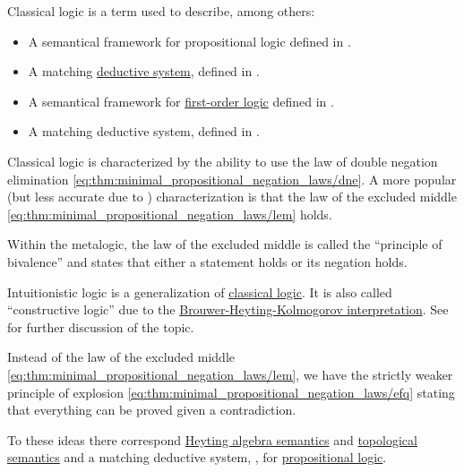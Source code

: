 \begin{remark}\label{rem:classical_logic}
  Classical logic is a term used to describe, among others:
  \begin{itemize}
    \item A semantical framework for propositional logic defined in .
    \item A matching \hyperref[def:deductive_system]{deductive system}, defined in .
    \item A semantical framework for \hyperref[subsec:first_order_logic]{first-order logic} defined in .
    \item A matching deductive system, defined in .
  \end{itemize}

  Classical logic is characterized by the ability to use the law of double negation elimination \eqref{eq:thm:minimal_propositional_negation_laws/dne}. A more popular (but less accurate due to ) characterization is that the law of the excluded middle \eqref{eq:thm:minimal_propositional_negation_laws/lem} holds.

  Within the metalogic, the law of the excluded middle is called the \enquote{principle of bivalence} and states that either a statement holds or its negation holds.
\end{remark}

\begin{remark}\label{rem:intuitionistic_logic}
  Intuitionistic logic is a generalization of \hyperref[rem:classical_logic]{classical logic}. It is also called \enquote{constructive logic} due to the \hyperref[rem:brouwer_heyting_kolmogorov_interpretation]{Brouwer-Heyting-Kolmogorov interpretation}. See  for further discussion of the topic.

  Instead of the law of the excluded middle \eqref{eq:thm:minimal_propositional_negation_laws/lem}, we have the strictly weaker principle of explosion \eqref{eq:thm:minimal_propositional_negation_laws/efq} stating that everything can be proved given a contradiction.

  To these ideas there correspond \hyperref[def:propositional_heyting_algebra_semantics]{Heyting algebra semantics} and \hyperref[def:propositional_topological_semantics]{topological semantics} and a matching deductive system, , for \hyperref[subsec:propositional_logic]{propositional logic}.
\end{remark}

